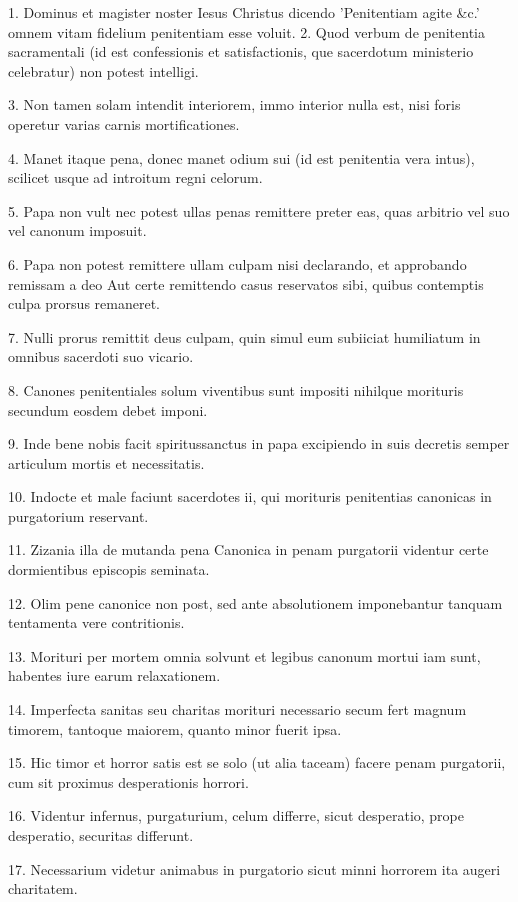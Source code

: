 1. Dominus et magister noster Iesus Christus dicendo 'Penitentiam agite
\&c.' omnem vitam fidelium penitentiam esse voluit. 2. Quod verbum de
penitentia sacramentali (id est confessionis et satisfactionis, que
sacerdotum ministerio celebratur) non potest intelligi.

3. Non tamen solam intendit interiorem, immo interior nulla est, nisi
foris operetur varias carnis mortificationes.

4. Manet itaque pena, donec manet odium sui (id est penitentia vera
intus), scilicet usque ad introitum regni celorum.

5. Papa non vult nec potest ullas penas remittere preter eas, quas
arbitrio vel suo vel canonum imposuit.

6. Papa non potest remittere ullam culpam nisi declarando, et
approbando remissam a deo Aut certe remittendo casus reservatos sibi,
quibus contemptis culpa prorsus remaneret.

7. Nulli prorus remittit deus culpam, quin simul eum subiiciat
humiliatum in omnibus sacerdoti suo vicario.

8. Canones penitentiales solum viventibus sunt impositi nihilque
morituris secundum eosdem debet imponi.

9. Inde bene nobis facit spiritussanctus in papa excipiendo in suis
decretis semper articulum mortis et necessitatis.

10. Indocte et male faciunt sacerdotes ii, qui morituris penitentias
canonicas in purgatorium reservant.

11. Zizania illa de mutanda pena Canonica in penam purgatorii videntur
certe dormientibus episcopis seminata.

12. Olim pene canonice non post, sed ante absolutionem imponebantur
tanquam tentamenta vere contritionis.

13. Morituri per mortem omnia solvunt et legibus canonum mortui iam
sunt, habentes iure earum relaxationem.

14. Imperfecta sanitas seu charitas morituri necessario secum fert
magnum timorem, tantoque maiorem, quanto minor fuerit ipsa.

15. Hic timor et horror satis est se solo (ut alia taceam) facere penam
purgatorii, cum sit proximus desperationis horrori.

16. Videntur infernus, purgaturium, celum differre, sicut desperatio,
prope desperatio, securitas differunt.

17. Necessarium videtur animabus in purgatorio sicut minni horrorem ita
augeri charitatem.

